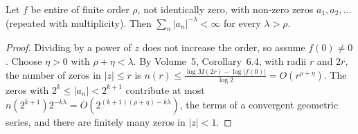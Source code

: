 \begin{lemma}\label{lem:zerocount}
Let $f$ be entire of finite order $\rho$, not identically zero, with non-zero zeros $a_1,a_2,\dots$ (repeated with multiplicity). Then $\sum_n|a_n|^{-\lambda}<\infty$ for every $\lambda>\rho$.
\end{lemma}
\begin{proof}
Dividing by a power of $z$ does not increase the order, so assume $f(0)\ne0$. Choose $\eta>0$ with $\rho+\eta<\lambda$. By Volume~5, Corollary~6.4, with radii $r$ and $2r$, the number of zeros in $|z|\le r$ is
$n(r)\le\frac{\log M(2r)-\log|f(0)|}{\log2}=O(r^{\rho+\eta})$. The zeros with $2^k\le|a_n|<2^{k+1}$ contribute at most $n(2^{k+1})2^{-k\lambda}=O(2^{(k+1)(\rho+\eta)-k\lambda})$, the terms of a convergent geometric series, and
there are finitely many zeros in $|z|<1$.
\end{proof}

